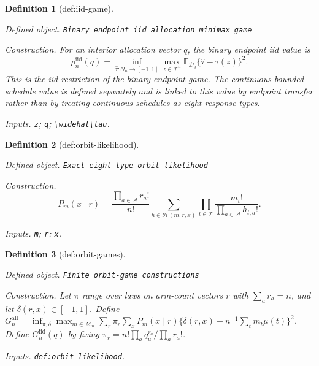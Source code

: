 \documentclass{article}
\newtheorem{definition}{Definition}
\begin{document}
\begin{definition}[def:iid-game]\label{def:iid-game}
\par\smallskip\noindent\emph{Defined object.} \texttt{Binary endpoint iid allocation minimax game}
\par\smallskip\noindent\emph{Construction.} For an interior allocation vector \(q\), the binary endpoint iid value is
\[
\rho_n^{\mathrm{iid}}(q)=\inf_{\widehat\tau:\mathcal O_n\to[-1,1]}
\max_{z\in\mathcal T^n}\mathbb E_{\mathcal D_q}\{\widehat\tau-\tau(z)\}^2.
\]
This is the iid restriction of the binary endpoint game.  The continuous bounded-schedule value is defined separately and is linked to this value by endpoint transfer rather than by treating continuous schedules as eight response types.
\par\smallskip\noindent\emph{Inputs.} \texttt{z}; \texttt{q}; \texttt{\textbackslash{}\allowbreak{}widehat\textbackslash{}\allowbreak{}tau}.
\end{definition}

\begin{definition}[def:orbit-likelihood]\label{def:orbit-likelihood}
\par\smallskip\noindent\emph{Defined object.} \texttt{Exact eight-\allowbreak{}type orbit likelihood}
\par\smallskip\noindent\emph{Construction.} \[P_m(x\mid r)=\frac{\prod_{a\in\mathcal A}r_a!}{n!}\sum_{h\in\mathcal H(m,r,x)}\prod_{t\in\mathcal T}\frac{m_t!}{\prod_{a\in\mathcal A}h_{t,a}!}.\]
\par\smallskip\noindent\emph{Inputs.} \texttt{m}; \texttt{r}; \texttt{x}.
\end{definition}

\begin{definition}[def:orbit-games]\label{def:orbit-games}
\par\smallskip\noindent\emph{Defined object.} \texttt{Finite orbit-\allowbreak{}game constructions}
\par\smallskip\noindent\emph{Construction.} Let \(\pi\) range over laws on arm-count vectors \(r\) with \(\sum_ar_a=n\), and let \(\delta(r,x)\in[-1,1]\). Define \(G_n^{\mathrm{all}}=\inf_{\pi,\delta}\max_{m\in\mathcal M_n}\sum_r\pi_r\sum_xP_m(x\mid r)\{\delta(r,x)-n^{-1}\sum_tm_t\mu(t)\}^2\). Define \(G_n^{\mathrm{iid}}(q)\) by fixing \(\pi_r=n!\prod_aq_a^{r_a}/\prod_ar_a!\).
\par\smallskip\noindent\emph{Inputs.} \texttt{def:\allowbreak{}orbit-\allowbreak{}likelihood}.
\end{definition}
\end{document}

